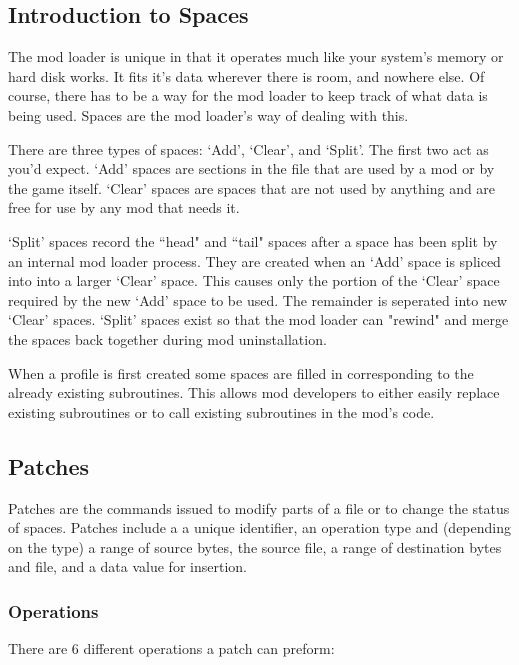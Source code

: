 \documentclass[12pt,a4paper,notitlepage]{article}
\begin{document}
\subsection{Introduction to Spaces}
\label{subsec:works-spaces}
The mod loader is unique in that it operates much like your system's memory or hard disk works. It fits it's data wherever there is room, and nowhere else. Of course, there has to be a way for the mod loader to keep track of what data is being used. Spaces are the mod loader's way of dealing with this.

There are three types of spaces: `Add', `Clear', and `Split'. The first two act as you'd expect. `Add' spaces are sections in the file that are used by a mod or by the game itself. `Clear' spaces are spaces that are not used by anything and are free for use by any mod that needs it. 

`Split' spaces record the ``head" and ``tail" spaces after a space has been split by an internal mod loader process. They are created when an `Add' space is spliced into into a larger `Clear' space. This causes only the portion of the `Clear' space required by the new `Add' space to be used. The remainder is seperated into new `Clear' spaces. `Split' spaces exist so that the mod loader can "rewind" and merge the spaces back together during mod uninstallation.

When a profile is first created some spaces are filled in corresponding to the already existing subroutines. This allows mod developers to either easily replace existing subroutines or to call existing subroutines in the mod's code.

\subsection{Patches}
\label{subsec:works-patch}
Patches are the commands issued to modify parts of a file or to change the status of spaces. Patches include a a unique identifier, an operation type and (depending on the type) a range of source bytes, the source file, a range of destination bytes and file, and a data value for insertion.

\subsubsection{Operations}
\label{subsubsec:works-patch-op}
There are 6 different operations a patch can preform: 
\end{document}
